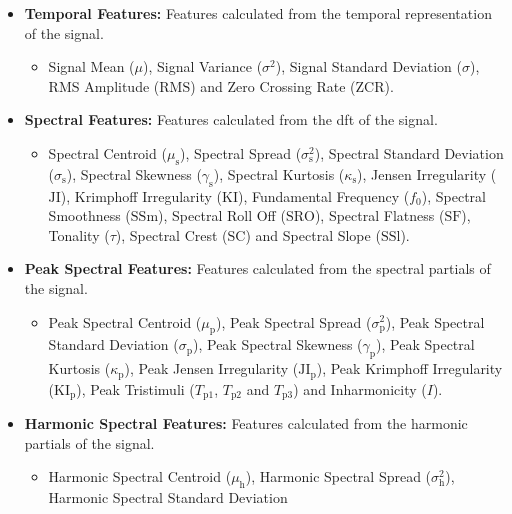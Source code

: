 		\begin{itemize}
			\item {\bf{Temporal Features:}} Features calculated from the temporal representation of the signal.
			\begin{itemize}
				\item Signal Mean ($\mu$), Signal Variance ($\sigma^{2}$), Signal Standard Deviation
				      ($\sigma$), RMS Amplitude ($\mathrm{RMS}$) and Zero Crossing Rate ($\mathrm{ZCR}$).
			\end{itemize}
		\item {\bf{Spectral Features:}} Features calculated from the \acrshort{dft} of the signal.
			\begin{itemize}
				\item Spectral Centroid ($\mu_{\mathrm{s}}$), Spectral Spread ($\sigma_{\mathrm{s}}^{2}$),
				      Spectral Standard Deviation ($\sigma_{\mathrm{s}}$), Spectral Skewness
				      ($\gamma_{\mathrm{s}}$), Spectral Kurtosis ($\kappa_{\mathrm{s}}$), Jensen
				      Irregularity ($\mathrm{JI}$), Krimphoff Irregularity ($\mathrm{KI}$), Fundamental
				      Frequency ($f_{0}$), Spectral Smoothness ($\mathrm{SSm}$), Spectral Roll Off
				      ($\mathrm{SRO}$), Spectral Flatness ($\mathrm{SF}$), Tonality ($\tau$), Spectral
				      Crest ($\mathrm{SC}$) and Spectral Slope ($\mathrm{SSl}$).
			\end{itemize}
			\item {\bf{Peak Spectral Features:}} Features calculated from the spectral partials of the signal.
			\begin{itemize}
				\item Peak Spectral Centroid ($\mu_{\mathrm{p}}$), Peak Spectral Spread
				      ($\sigma_{\mathrm{p}}^{2}$), Peak Spectral Standard Deviation
				      ($\sigma_{\mathrm{p}}$), Peak Spectral Skewness ($\gamma_{\mathrm{p}}$), Peak
				      Spectral Kurtosis ($\kappa_{\mathrm{p}}$), Peak Jensen Irregularity
				      ($\mathrm{JI_{p}}$), Peak Krimphoff Irregularity
				      ($\mathrm{KI_{p}}$), Peak Tristimuli ($T_{\mathrm{p}1}$, $T_{\mathrm{p}2}$
				      and $T_{\mathrm{p}3}$) and Inharmonicity ($I$).
			\end{itemize}
			\item {\bf{Harmonic Spectral Features:}} Features calculated from the harmonic partials of the
			      signal.
			\begin{itemize}
				\item Harmonic Spectral Centroid ($\mu_{\mathrm{h}}$), Harmonic Spectral Spread
				      ($\sigma_{\mathrm{h}}^{2}$), Harmonic Spectral Standard Deviation

\end{itemize}
\end{itemize}
